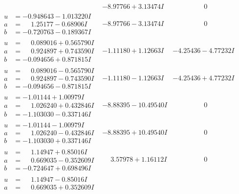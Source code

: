 \documentclass[1p]{elsarticle_modified}
\theoremstyle{definition}
\begin{document}
$$\begin{array}{c|c|c}
 & -8.97766 + 3.13474 I & \phantom{-0.000000 } 0 \\ \hline\begin{aligned}
u &= -0.948643 - 1.013220 I \\
a &= \phantom{-}1.25177 - 0.68906 I \\
b &= -0.720763 - 0.189367 I\end{aligned}
 & -8.97766 - 3.13474 I & \phantom{-0.000000 } 0 \\ \hline\begin{aligned}
u &= \phantom{-}0.089016 + 0.565790 I \\
a &= \phantom{-}0.924897 + 0.743590 I \\
b &= -0.094656 + 0.871815 I\end{aligned}
 & -1.11180 + 1.12663 I & -4.25436 - 4.77232 I \\ \hline\begin{aligned}
u &= \phantom{-}0.089016 - 0.565790 I \\
a &= \phantom{-}0.924897 - 0.743590 I \\
b &= -0.094656 - 0.871815 I\end{aligned}
 & -1.11180 - 1.12663 I & -4.25436 + 4.77232 I \\ \hline\begin{aligned}
u &= -1.01144 + 1.00979 I \\
a &= \phantom{-}1.026240 + 0.432846 I \\
b &= -1.103030 - 0.337146 I\end{aligned}
 & -8.88395 - 10.49540 I & \phantom{-0.000000 } 0 \\ \hline\begin{aligned}
u &= -1.01144 - 1.00979 I \\
a &= \phantom{-}1.026240 - 0.432846 I \\
b &= -1.103030 + 0.337146 I\end{aligned}
 & -8.88395 + 10.49540 I & \phantom{-0.000000 } 0 \\ \hline\begin{aligned}
u &= \phantom{-}1.14947 + 0.85016 I \\
a &= \phantom{-}0.669035 - 0.352609 I \\
b &= -0.724647 + 0.698496 I\end{aligned}
 & \phantom{-}3.57978 + 1.16112 I & \phantom{-0.000000 } 0 \\ \hline\begin{aligned}
u &= \phantom{-}1.14947 - 0.85016 I \\
a &= \phantom{-}0.669035 + 0.352609 I \\

\end{aligned}
\end{array}$$
\end{document}
